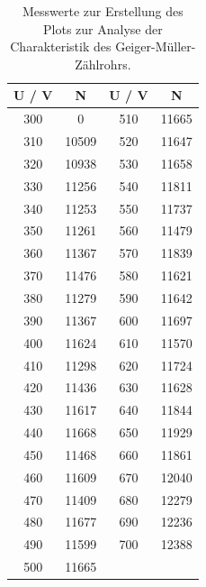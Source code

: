 \begin{table}
  \centering
  \caption{Messwerte zur Erstellung des Plots zur Analyse der Charakteristik des Geiger-Müller-Zählrohrs.}
  \begin{tabular}{ c c c c }
  \toprule
  {U / V} & { N } & { U / V } & { N } \\
  \midrule
300   &       0   &   510   &   11665   \\
310   &   10509   &   520   &   11647   \\
320   &   10938   &   530   &   11658   \\
330   &   11256   &   540   &   11811   \\
340   &   11253   &   550   &   11737   \\
350   &   11261   &   560   &   11479   \\
360   &   11367   &   570   &   11839   \\
370   &   11476   &   580   &   11621   \\
380   &   11279   &   590   &   11642   \\
390   &   11367   &   600   &   11697   \\
400   &   11624   &   610   &   11570   \\
410   &   11298   &   620   &   11724   \\
420   &   11436   &   630   &   11628   \\
430   &   11617   &   640   &   11844   \\
440   &   11668   &   650   &   11929   \\
450   &   11468   &   660   &   11861   \\
460   &   11609   &   670   &   12040   \\
470   &   11409   &   680   &   12279   \\
480   &   11677   &   690   &   12236   \\
490   &   11599   &   700   &   12388   \\
500   &   11665   &         &           \\
    \bottomrule
  \end{tabular}
  \label{tab1}
\end{table}
\FloatBarrier

